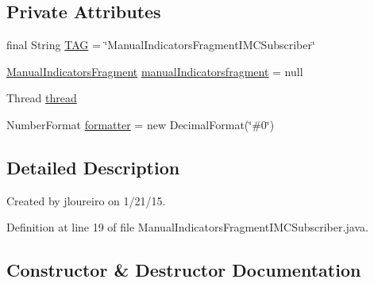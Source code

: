 \subsection*{Private Attributes}
\begin{DoxyCompactItemize}
\item 
final String \hyperlink{classpt_1_1lsts_1_1asa_1_1subscribers_1_1ManualIndicatorsFragmentIMCSubscriber_a903da680d4446a05739235db44511042}{T\+A\+G} = \char`\"{}Manual\+Indicators\+Fragment\+I\+M\+C\+Subscriber\char`\"{}
\item 
\hyperlink{classpt_1_1lsts_1_1asa_1_1fragments_1_1ManualIndicatorsFragment}{Manual\+Indicators\+Fragment} \hyperlink{classpt_1_1lsts_1_1asa_1_1subscribers_1_1ManualIndicatorsFragmentIMCSubscriber_aed562c78c365b11b8c6a12fbee977aa0}{manual\+Indicatorsfragment} = null
\item 
Thread \hyperlink{classpt_1_1lsts_1_1asa_1_1subscribers_1_1ManualIndicatorsFragmentIMCSubscriber_ac688b3e00ef68800684d04ad43ba2fc7}{thread}
\item 
Number\+Format \hyperlink{classpt_1_1lsts_1_1asa_1_1subscribers_1_1ManualIndicatorsFragmentIMCSubscriber_a338c7e858b9dd40a1f6c3aed34de02fc}{formatter} = new Decimal\+Format(\char`\"{}\#0\char`\"{})
\end{DoxyCompactItemize}


\subsection{Detailed Description}
Created by jloureiro on 1/21/15. 

Definition at line 19 of file Manual\+Indicators\+Fragment\+I\+M\+C\+Subscriber.\+java.



\subsection{Constructor \& Destructor Documentation}
\hypertarget{classpt_1_1lsts_1_1asa_1_1subscribers_1_1ManualIndicatorsFragmentIMCSubscriber_a15a9a2a4e04659d3f18c751aaee6d7a9}{}
